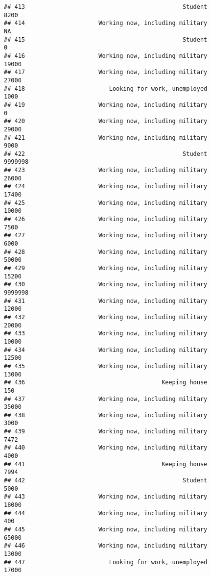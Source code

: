 \documentclass[]{book}
\theoremstyle{definition}
\theoremstyle{definition}
\theoremstyle{remark}
\begin{document}
\begin{verbatim}
## 413                                             Student            8200
## 414                     Working now, including military              NA
## 415                                             Student               0
## 416                     Working now, including military           19000
## 417                     Working now, including military           27000
## 418                        Looking for work, unemployed            1000
## 419                     Working now, including military               0
## 420                     Working now, including military           29000
## 421                     Working now, including military            9000
## 422                                             Student         9999998
## 423                     Working now, including military           26000
## 424                     Working now, including military           17400
## 425                     Working now, including military           10000
## 426                     Working now, including military            7500
## 427                     Working now, including military            6000
## 428                     Working now, including military           50000
## 429                     Working now, including military           15200
## 430                     Working now, including military         9999998
## 431                     Working now, including military           12000
## 432                     Working now, including military           20000
## 433                     Working now, including military           10000
## 434                     Working now, including military           12500
## 435                     Working now, including military           13000
## 436                                       Keeping house             150
## 437                     Working now, including military           35000
## 438                     Working now, including military            3000
## 439                     Working now, including military            7472
## 440                     Working now, including military            4000
## 441                                       Keeping house            7994
## 442                                             Student            5000
## 443                     Working now, including military           18000
## 444                     Working now, including military             400
## 445                     Working now, including military           65000
## 446                     Working now, including military           13000
## 447                        Looking for work, unemployed           17000

\end{verbatim}
\end{document}
